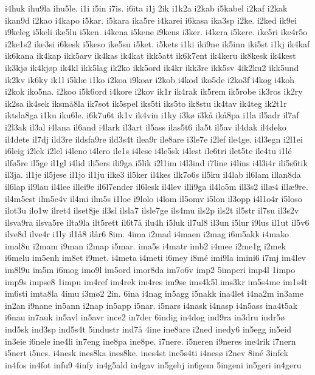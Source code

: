 {i4huk
ihu9la
ihu5le.
i1i
i5in
i7is.
i6ita
i1j
2ik
i1k2a
i2kab
i5kabel
i2kaf
i2kak
ikan9d
i2kao
i4kapo
i5kar.
i5kara
ika5re
i4karei
i6kasa
ika3sp
i2ke.
i2ked
ik9ei
i9keleg
i5keli
ike5lu
i5ken.
i4kena
i5kene
i9kens
i3ker.
i4kera
i5kere.
ike5ri
ike4r5o
i2ke1s2
ike3si
i6kesk
i5keso
ike5su
i5ket.
i5kets
i1ki
iki9ne
ik5inn
iki5st
i1kj
ik4kaf
ik6kana
ik4kap
ikk5arv
ik4kas
ik4kat
ikk5att
ik6k7ent
ik4keru
ik8kesk
ik4kest
ik3kj^^f8
ik4kj^^f8p
ik4kl
ikk5lag
ik2ko
ikk5ord
ik4kr
ikk3re
ikk5sv
4ik2ku2
ikk5und
ik2kv
ik6ky
ik1l
i5kl^^e6
i1ko
i2koa
i9koar
i2kob
i4kod
iko5de
i2ko3f
i4kog
i4koh
i2kok
iko5na.
i2koo
i5k6ord
i4kore
i2kov
ik1r
ik4rak
ik5rem
ik5robe
ik3ros
ik2ry
ik2sa
ik4sek
iksm^^e58la
ik7sot
ik5spel
iks5ti
iks5to
ik8stu
ik4tav
ik4teg
ik2t1r
iktsla8ga
i1ku
iku6le.
i6k7u6t
ik1v
ik4vin
i1ky
i3k^^f8
i3k^^e5
ik^^e58pa
i1la
il5adr
il7af
i2l3ak
il3al
i4lana
il6and
i4lark
il3art
il5ass
ilas5t6
ila5t
il5av
il4dak
il4deko
il4dete
il7dj
ild3re
ildsfa9re
ild3s4t
ilea9r
ile8are
i3le7e
i2lef
ile4ge.
i4l3egn
i2l1ei
i6leig
i2lek
i2lel
i4leno
i4lero
ile1s
i4lese
i4le5sk
i4lest
ile6tri
ilet5te
ile4tu
i1l^^e9
ilf^^f85re
il5ge
il1gl
i4lid
ili5ers
ili9ga
i5lik
i2l1im
i4l3ind
i7line
i4lins
i4l3i4r
ili5s6tik
il3ja.
il1je
il5jese
il1jo
il1ju
ilke3
il5ker
il4kes
ilk7o6s
il5ku
il4lab
il6lam
illan8da
il6lap
il9lau
il4lee
illei9e
il6l7ender
il6lesk
il4lev
illi9ga
il4lo5m
ill3s2
ill^^e64
ill^^e69re.
il4m5est
ilm5e4v
il4mi
ilm5s
i1loe
i9lolo
i4lom
il5omv
i5lon
il3opp
i4l1o4r
i5loso
ilot3u
ilo1w
ilret4
ilset8je
il3sl
ilsla7
ilsle7ge
ils4mu
ils2p
ils2t
il5str
il7su
il3s2v
ilsva9ra
ilsva5re
ilta9la
ilt5rett
il6t7^^e5
ilu4h
i5luk
il7ul8
il3un
i5lur
i9lus
il1ut
il5v6
ilve8d
ilve4r
i1ly
il1^^e58
il^^e5r6
8im.
4ima
i2mad
i4maen
i2mag
i6m5akk
i4mako
imal8n
i2mam
i9man
i2map
i5mar.
ima5s
i4matr
imb2
i4mee
i2me1g
i2mek
i6melu
im5enh
im8et
i9met.
i4meta
i4meti
i6mey
i8m^^e9
imi9la
imini6
i7mj
im4lev
im8l9u
im5m
i6mog
imo9l
im5ord
imor8da
im7o6v
imp2
5imperi
imp4l
1impo
imp9s
impse8
1impu
im4ref
im4rek
im4res
im9se
ims4k5l
ims3kr
im5s4me
im1s4t
im6sti
imta8la
4imu
i3m^^f82
2in.
6ina
i4nag
in5agg
i5nakk
ina4let
i4na2m
in3ame
in2an
i9nane
in5ann
i2nap
in5app
i5nar.
i5nars
i4nask
i4nasp
i4n5ass
ina4t5ak
i6nau
in7auk
in5avl
in5avr
ince2
in7der
6indig
in4dog
ind9ra
in3dru
indr5^^f8
ind5sk
ind3sp
ind5s4t
5industr
ind7^^e5
4ine
ine8are
i2ned
inedy6
in5egg
in5eid
in3eie
i6nele
ine4li
in7eng
ine8pa
ine8pe.
i7nere.
i5neren
i9neres
ine4rik
i7nern
i5nert
i5nes.
i4nesk
ines8ka
ines8ke.
ines4st
ine5s4ti
i4nes^^f8
i2nev
8in^^e9
3infek
in4fos
in4fot
infu9
4infy
in4g5ald
in4gav
in5gebj
in6gem
5ingeni
in5geri
in4geru
}
